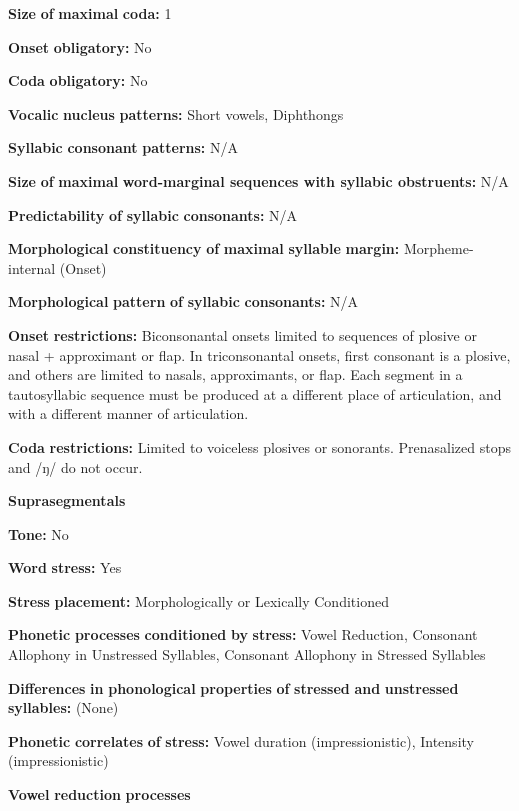 \textbf{Size} \textbf{of} \textbf{maximal} \textbf{coda:} 1

\textbf{Onset} \textbf{obligatory:} No

\textbf{Coda} \textbf{obligatory:} No

\textbf{Vocalic} \textbf{nucleus} \textbf{patterns:} Short vowels, Diphthongs

\textbf{Syllabic} \textbf{consonant} \textbf{patterns:} N/A

\textbf{Size} \textbf{of} \textbf{maximal} \textbf{word{}-marginal sequences with syllabic obstruents:} N/A

\textbf{Predictability} \textbf{of} \textbf{syllabic} \textbf{consonants:} N/A 

\textbf{Morphological} \textbf{constituency} \textbf{of} \textbf{maximal} \textbf{syllable} \textbf{margin:} Morpheme-internal (Onset)

\textbf{Morphological} \textbf{pattern} \textbf{of} \textbf{syllabic} \textbf{consonants:} N/A

\textbf{Onset} \textbf{restrictions:} Biconsonantal onsets limited to sequences of plosive or nasal + approximant or flap. In triconsonantal onsets, first consonant is a plosive, and others are limited to nasals, approximants, or flap. Each segment in a tautosyllabic sequence must be produced at a different place of articulation, and with a different manner of articulation.

\textbf{Coda} \textbf{restrictions:} Limited to voiceless plosives or sonorants. Prenasalized stops and /ŋ/ do not occur.

\textbf{Suprasegmentals}

\textbf{Tone:} No

\textbf{Word} \textbf{stress:} Yes

\textbf{Stress} \textbf{placement:} Morphologically or Lexically Conditioned

\textbf{Phonetic} \textbf{processes} \textbf{conditioned} \textbf{by} \textbf{stress:} Vowel Reduction, Consonant Allophony in Unstressed Syllables, Consonant Allophony in Stressed Syllables

\textbf{Differences} \textbf{in} \textbf{phonological} \textbf{properties} \textbf{of} \textbf{stressed} \textbf{and} \textbf{unstressed} \textbf{syllables:} (None)

\textbf{Phonetic} \textbf{correlates} \textbf{of} \textbf{stress:} Vowel duration (impressionistic), Intensity (impressionistic)

\textbf{Vowel} \textbf{reduction} \textbf{processes}

